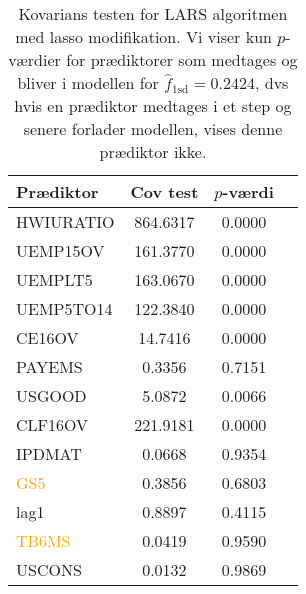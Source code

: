 \begin{table}[ht] 
\centering 
\begin{tabular}{lccc}
\toprule
Prædiktor & Cov test & \(p\)-værdi \\
\midrule
 \textcolor{blue3}{HWIURATIO}  &   864.6317 & 0.0000 \\
 \textcolor{blue3}{UEMP15OV}  &   161.3770&  0.0000 \\
 \textcolor{blue3}{UEMPLT5} &  163.0670 & 0.0000 \\
 \textcolor{blue3}{UEMP5TO14}  &   122.3840  &0.0000 \\
 \textcolor{blue3}{CE16OV} & 14.7416  &0.0000 \\
 \textcolor{blue3}{PAYEMS} &  0.3356  &0.7151 \\
  \textcolor{blue3}{USGOOD}  &   5.0872 & 0.0066 \\
 \textcolor{blue3}{CLF16OV}    &   221.9181 & 0.0000 \\
\textcolor{chartreuse4}{IPDMAT}       &    0.0668&  0.9354 \\
\textcolor{orange}{GS5}   &       0.3856 &    0.6803 \\
 \textcolor{blue3}{ lag1 }  &      0.8897 &    0.4115 \\
\textcolor{orange}{ TB6MS }&       0.0419   &  0.9590 \\
 \textcolor{blue3}{USCONS }&   0.0132   &  0.9869 \\ 
\bottomrule
\end{tabular}

\caption{Kovarians testen for LARS algoritmen med lasso modifikation.
Vi viser kun \(p\)-værdier for prædiktorer som medtages og bliver i modellen for \(\widehat{f}_{1\text{sd}}=0.2424\), dvs hvis en prædiktor medtages i et step og senere forlader modellen, vises denne prædiktor ikke.} \label{tab:covTest}
\end{table} 
